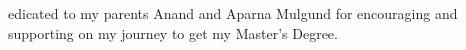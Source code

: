 \dedication

Dedicated to my parents Anand and Aparna Mulgund for encouraging and supporting on my journey to get my Master's Degree.